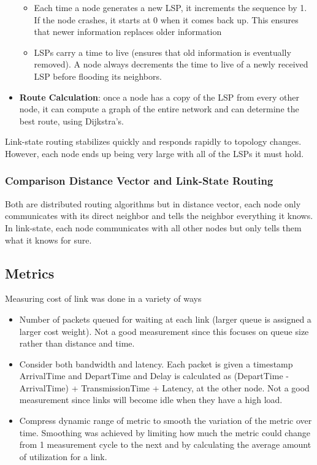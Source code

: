 \documentclass{article}
\begin{document}
\begin{itemize}
\begin{itemize}
        \item Each time a node generates a new LSP, it increments the sequence by 1. If the node crashes, it starts at 0 when it comes back up. This ensures that newer information replaces older information
        \item LSPs carry a time to live (ensures that old information is eventually removed). A node always decrements the time to live of a newly received LSP before flooding its neighbors.
      \end{itemize}
    \item \textbf{Route Calculation}: once a node has a copy of the LSP from every other node, it can compute a graph of the entire network and can determine the best route, using Dijkstra's.
  \end{itemize}
  Link-state routing stabilizes quickly and responds rapidly to topology changes. However, each node ends up being very large with all of the LSPs it must hold.
  \subsubsection{Comparison Distance Vector and Link-State Routing}
  Both are distributed routing algorithms but in distance vector, each node only communicates with its direct neighbor and tells the neighbor everything it knows. In link-state, each node communicates with all other nodes but only tells them what it knows for sure.
  \subsection{Metrics}
  Measuring cost of link was done in a variety of ways
  \begin{itemize}
    \item Number of packets queued for waiting at each link (larger queue is assigned a larger cost weight). Not a good measurement since this focuses on queue size rather than distance and time.
    \item Consider both bandwidth and latency. Each packet is given a timestamp ArrivalTime and DepartTime and Delay is calculated as (DepartTime - ArrivalTime) + TransmissionTime + Latency, at the other node. Not a good measurement since links will become idle when they have a high load.
    \item Compress dynamic range of metric to smooth the variation of the metric over time. Smoothing was achieved by limiting how much the metric could change from 1 measurement cycle to the next and by calculating the average amount of utilization for a link.
  \end{itemize}
\end{document}
